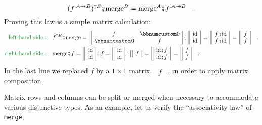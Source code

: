 ~\vspace{-0.3\baselineskip}
\[
(f^{:A\rightarrow B})^{\uparrow E}\bef\text{merge}^{B}=\text{merge}^{A}\bef f^{:A\rightarrow B}\quad.
\]
Proving this law is a simple matrix calculation:
\begin{align*}
{\color{greenunder}\text{left-hand side}:}\quad & f^{\uparrow E}\bef\text{merge}=\,\begin{array}{||cc|}
f & \bbnum 0\\
\bbnum 0 & f
\end{array}\,\bef\,\begin{array}{||c|}
\text{id}\\
\text{id}
\end{array}\,=\,\begin{array}{||c|}
f\bef\text{id}\\
f\bef\text{id}
\end{array}\,=\,\begin{array}{||c|}
f\\
f
\end{array}\quad,\\
{\color{greenunder}\text{right-hand side}:}\quad & \text{merge}\bef f=\,\begin{array}{||c|}
\text{id}\\
\text{id}
\end{array}\,\bef\gunderline f=\,\begin{array}{||c|}
\text{id}\\
\text{id}
\end{array}\,\bef\,\begin{array}{||c|}
f\end{array}\,=\,\begin{array}{||c|}
\text{id}\bef f\\
\text{id}\bef f
\end{array}\,=\,\begin{array}{||c|}
f\\
f
\end{array}\quad.
\end{align*}
In the last line we replaced $f$ by a $1\times1$ matrix, $\,\begin{array}{||c|}
f\end{array}$~, in order to apply matrix composition.

Matrix rows and columns can be split or merged when necessary to accommodate
various disjunctive types. As an example, let us verify the \textsf{``}associativity
law\textsf{''} of \lstinline!merge!,

